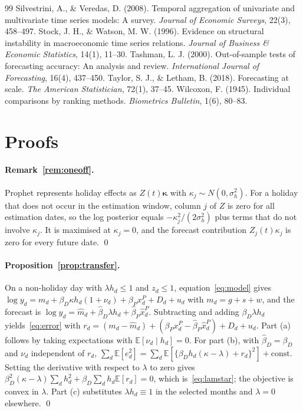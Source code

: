 \documentclass{article}
\theoremstyle{plain}
\theoremstyle{definition}
\theoremstyle{remark}
\newcommand{\E}{\mathbb{E}}
\begin{document}
\begin{thebibliography}{99}
 Silvestrini, A., \& Veredas, D. (2008). Temporal aggregation of univariate and multivariate time series models: A survey. \emph{Journal of Economic Surveys}, 22(3), 458--497.
 Stock, J. H., \& Watson, M. W. (1996). Evidence on structural instability in macroeconomic time series relations. \emph{Journal of Business \& Economic Statistics}, 14(1), 11--30.
 Tashman, L. J. (2000). Out-of-sample tests of forecasting accuracy: An analysis and review. \emph{International Journal of Forecasting}, 16(4), 437--450.
 Taylor, S. J., \& Letham, B. (2018). Forecasting at scale. \emph{The American Statistician}, 72(1), 37--45.
 Wilcoxon, F. (1945). Individual comparisons by ranking methods. \emph{Biometrics Bulletin}, 1(6), 80--83.
\end{thebibliography}

\appendix
\section{Proofs}\label{app:proofs}
\paragraph{Remark~\ref{rem:oneoff}.} Prophet represents holiday effects as $Z(t)\bm{\kappa}$ with $\kappa_j\sim N(0,\sigma_h^2)$. For a holiday that does not occur in the estimation window, column $j$ of $Z$ is zero for all estimation dates, so the log posterior equals $-\kappa_j^2/(2\sigma_h^2)$ plus terms that do not involve $\kappa_j$. It is maximised at $\kappa_j=0$, and the forecast contribution $Z_j(t)\kappa_j$ is zero for every future date. \qed

\paragraph{Proposition~\ref{prop:transfer}.} On a non-holiday day with $\lambda h_d\le1$ and $z_d\le1$, equation~\eqref{eq:model} gives $\log y_d=m_d+\beta_D\kappa h_d(1+\nu_d)+\beta_P x^P_d+D_d+u_d$ with $m_d=g+s+w$, and the forecast is $\log\hat y_d=\hat m_d+\hat\beta_D\lambda h_d+\hat\beta_P\hat x^P_d$. Subtracting and adding $\beta_D\lambda h_d$ yields~\eqref{eq:error} with $r_d=(m_d-\hat m_d)+(\beta_P x^P_d-\hat\beta_P\hat x^P_d)+D_d+u_d$. Part (a) follows by taking expectations with $\E[\nu_d\mid h_d]=0$. For part (b), with $\hat\beta_D=\beta_D$ and $\nu_d$ independent of $r_d$, $\sum_d\E[e_d^2]=\sum_d\E[\{\beta_D h_d(\kappa-\lambda)+r_d\}^2]+\text{const}$. Setting the derivative with respect to $\lambda$ to zero gives $\beta_D^2(\kappa-\lambda)\sum_d h_d^2+\beta_D\sum_d h_d\E[r_d]=0$, which is~\eqref{eq:lamstar}; the objective is convex in $\lambda$. Part (c) substitutes $\lambda h_d\equiv1$ in the selected months and $\lambda=0$ elsewhere. \qed
\end{document}
